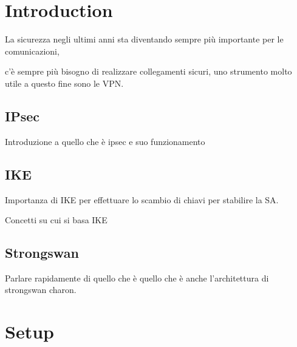 \documentclass[
10pt, %
a4paper, %
oneside, %
headinclude,footinclude, %
BCOR5mm, %
]{scrartcl}
\begin{document}

\newpage %


\section{Introduction}

La sicurezza negli ultimi anni sta diventando sempre più importante per le comunicazioni, 

c'è sempre più bisogno di realizzare collegamenti sicuri, uno strumento molto utile a questo fine sono le VPN.



\subsection{IPsec}

Introduzione a quello che è ipsec e suo funzionamento

\subsection{IKE}


Importanza di IKE per effettuare lo scambio di chiavi per stabilire la SA.

Concetti su cui si basa IKE

\subsection{Strongswan}

Parlare rapidamente di quello che è
quello che è anche l'architettura di strongswan charon.


\section{Setup}
\end{document}

